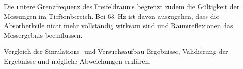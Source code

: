 Die untere Grenzfrequenz des Freifeldraums begrenzt zudem die Gültigkeit der Messungen im Tieftonbereich. Bei \SI{63}{\hertz} ist davon auszugehen, dass die Absorberkeile nicht mehr vollständig wirksam sind und Raumreflexionen das Messergebnis beeinflussen.



 
Vergleich der Simulations- und Versuchsaufbau-Ergebnisse, Validierung der Ergebnisse und mögliche Abweichungen erklären.





